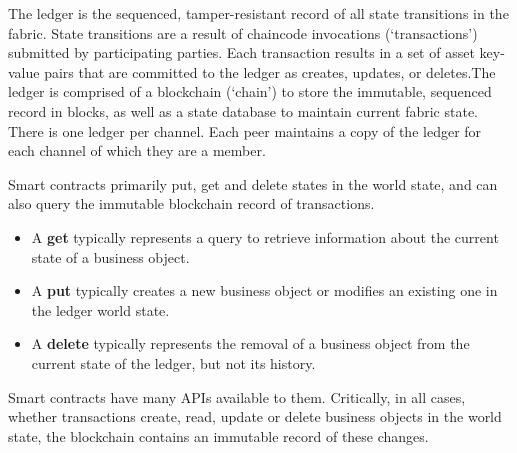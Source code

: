 The ledger is the sequenced, tamper-resistant record of all state transitions in the fabric. State transitions are a result of chaincode invocations (‘transactions’) submitted by participating parties. Each transaction results in a set of asset key-value pairs that are committed to the ledger as creates, updates, or deletes.The ledger is comprised of a blockchain (‘chain’) to store the immutable, sequenced record in blocks, as well as a state database to maintain current fabric state. There is one ledger per channel. Each peer maintains a copy of the ledger for each channel of which they are a member.

Smart contracts primarily put, get and delete states in the world state, and can also query the immutable blockchain record of transactions.

\begin{itemize}
\item A \textbf{get} typically represents a query to retrieve information about the current state of a business object.
\item A \textbf{put} typically creates a new business object or modifies an existing one in the ledger world state.
\item A \textbf{delete} typically represents the removal of a business object from the current state of the ledger, but not its history.
\end{itemize}

Smart contracts have many APIs available to them. Critically, in all cases, whether transactions create, read, update or delete business objects in the world state, the blockchain contains an immutable record of these changes.

